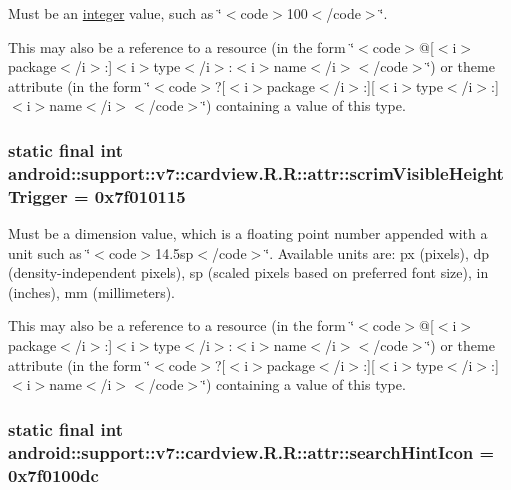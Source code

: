 Must be an \hyperlink{classandroid_1_1support_1_1v7_1_1cardview_1_1_r_1_1integer}{integer} value, such as \char`\"{}$<$code$>$100$<$/code$>$\char`\"{}. 

This may also be a reference to a resource (in the form \char`\"{}$<$code$>$@\mbox{[}$<$i$>$package$<$/i$>$:\mbox{]}$<$i$>$type$<$/i$>$:$<$i$>$name$<$/i$>$$<$/code$>$\char`\"{}) or theme attribute (in the form \char`\"{}$<$code$>$?\mbox{[}$<$i$>$package$<$/i$>$:\mbox{]}\mbox{[}$<$i$>$type$<$/i$>$:\mbox{]}$<$i$>$name$<$/i$>$$<$/code$>$\char`\"{}) containing a value of this type. \hypertarget{classandroid_1_1support_1_1v7_1_1cardview_1_1_r_1_1attr_fc0e6f2fa0b32e9a8d0e73ec2204fb68}{
\subsubsection[{scrimVisibleHeightTrigger}]{\setlength{\rightskip}{0pt plus 5cm}static final int android::support::v7::cardview.R.R::attr::scrimVisibleHeightTrigger = 0x7f010115}}
\label{classandroid_1_1support_1_1v7_1_1cardview_1_1_r_1_1attr_fc0e6f2fa0b32e9a8d0e73ec2204fb68}


Must be a dimension value, which is a floating point number appended with a unit such as \char`\"{}$<$code$>$14.5sp$<$/code$>$\char`\"{}. Available units are: px (pixels), dp (density-independent pixels), sp (scaled pixels based on preferred font size), in (inches), mm (millimeters). 

This may also be a reference to a resource (in the form \char`\"{}$<$code$>$@\mbox{[}$<$i$>$package$<$/i$>$:\mbox{]}$<$i$>$type$<$/i$>$:$<$i$>$name$<$/i$>$$<$/code$>$\char`\"{}) or theme attribute (in the form \char`\"{}$<$code$>$?\mbox{[}$<$i$>$package$<$/i$>$:\mbox{]}\mbox{[}$<$i$>$type$<$/i$>$:\mbox{]}$<$i$>$name$<$/i$>$$<$/code$>$\char`\"{}) containing a value of this type. \hypertarget{classandroid_1_1support_1_1v7_1_1cardview_1_1_r_1_1attr_0b3389e24a8a82afc3b9b8e8bd2d34ec}{
\subsubsection[{searchHintIcon}]{\setlength{\rightskip}{0pt plus 5cm}static final int android::support::v7::cardview.R.R::attr::searchHintIcon = 0x7f0100dc}}
\label{classandroid_1_1support_1_1v7_1_1cardview_1_1_r_1_1attr_0b3389e24a8a82afc3b9b8e8bd2d34ec}


